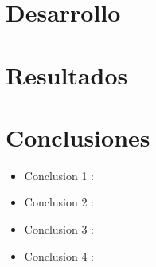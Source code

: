 \documentclass[preprint,12pt]{elsarticle}
\begin{document}
\begin{multicols}{2} 

\section{Desarrollo} 








\section{Resultados}

\cite{Gartner} 





\section{Conclusiones}

\begin{itemize}

\item Conclusion 1 : \\

\item Conclusion 2 : \\ 

\item Conclusion 3 : \\ 

\item Conclusion 4 : \\ 
\end{itemize}

\end{multicols}

	
	\newpage
	
		 
\end{document}
